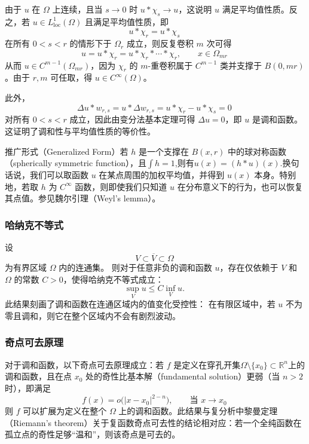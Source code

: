由于 \(u\) 在 \(\Omega\) 上连续，且当 \(s \to 0\) 时 \(u * \chi_s \to u\)，这说明 \(u\) 满足平均值性质。反之，若 \(u \in L^1_{\mathrm{loc}}(\Omega)\) 且满足平均值性质，即
\[
u * \chi_r = u * \chi_s~
\]
在所有 \(0 < s < r\) 的情形下于 \(\Omega_r\) 成立，则反复卷积 \(m\) 次可得
\[
u = u * \chi_r = u * \chi_r * \cdots * \chi_r, \qquad x \in \Omega_{mr}~
\]
从而 \(u \in C^{m-1}(\Omega_{mr})\)，因为 \(\chi_r\) 的 \(m\)-重卷积属于 \(C^{m-1}\) 类并支撑于 \(B(0,mr)\)。由于 \(r,m\) 可任取，得 \(u \in C^{\infty}(\Omega)\)。

此外，
\[
\Delta u * w_{r,s} = u * \Delta w_{r,s} = u * \chi_r - u * \chi_s = 0~
\]
对所有 \(0 < s < r\) 成立，因此由变分法基本定理可得 \(\Delta u = 0\)，即 \(u\) 是调和函数。这证明了调和性与平均值性质的等价性。

推广形式（Generalized Form）若 \(h\) 是一个支撑在 \(B(x, r)\) 中的球对称函数（spherically symmetric function），且\(\int h = 1\),则有\(u(x) = (h * u)(x)\).换句话说，我们可以取函数 \(u\) 在某点周围的加权平均值，并得到 \(u(x)\) 本身。特别地，若取 \(h\) 为 \(C^{\infty}\) 函数，则即使我们只知道 \(u\) 在分布意义下的行为，也可以恢复其点值。参见魏尔引理（Weyl’s lemma）。
\subsubsection{哈纳克不等式}
设
\[
V \subset \overline{V} \subset \Omega~
\]
为有界区域 \(\Omega\) 内的连通集。  
则对于任意非负的调和函数 \(u\)，存在仅依赖于 \(V\) 和 \(\Omega\) 的常数 \(C > 0\)，使得哈纳克不等式成立：
\[
\sup_{V} u \leq C \inf_{V} u.~
\]
此结果刻画了调和函数在连通区域内的值变化受控性：  
在有限区域中，若 \(u\) 不为零且调和，则它在整个区域内不会有剧烈波动。
\subsubsection{奇点可去原理}
对于调和函数，以下奇点可去原理成立：若 \( f \) 是定义在穿孔开集\(\Omega \setminus \{x_0\} \subset \mathbb{R}^n\)上的调和函数，且在点 \(x_0\) 处的奇性比基本解（fundamental solution）更弱（当 \(n > 2\) 时），即满足
\[
f(x) = o\bigl(|x - x_0|^{2 - n}\bigr), \qquad \text{当 } x \to x_0~
\]
则 \(f\) 可以扩展为定义在整个 \(\Omega\) 上的调和函数。此结果与复分析中黎曼定理（Riemann's theorem）关于复函数奇点可去性的结论相对应：若一个全纯函数在孤立点的奇性足够“温和”，则该奇点是可去的。






